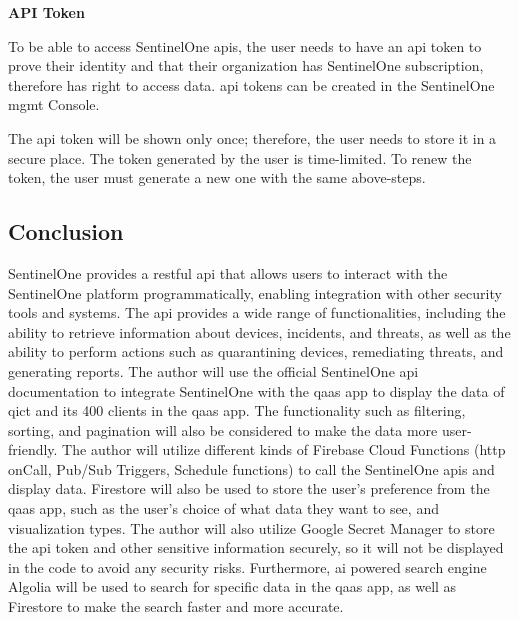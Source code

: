 \begin{multicols}{2}
      \textbf{API Token}

      To be able to access SentinelOne \acrshort{api}s, the user needs to have an \acrshort{api} token to prove their
      identity and that their organization has SentinelOne subscription, therefore has right to access data.
      \acrshort{api} tokens can be created in the SentinelOne \acrshort{mgmt} Console.

      The \acrshort{api} token will be shown only once; therefore, the user needs to store it in a secure place.
      The token generated by the user is time-limited. To renew the token, the user must generate a new one with
      the same above-steps.

      \subsection{Conclusion}
      SentinelOne provides a \acrshort{rest}ful \acrshort{api} that allows users to interact with the SentinelOne platform
      programmatically, enabling integration with other security tools and systems. The \acrshort{api} provides a wide range of
      functionalities, including the ability to retrieve information about devices, incidents, and threats, as well as the ability
      to perform actions such as quarantining devices, remediating threats, and generating reports. The author will use the official
      SentinelOne \acrshort{api} documentation to integrate SentinelOne with the \acrshort{qaas} app to display the data of
      \acrshort{qict} and its 400 clients in the \acrshort{qaas} app. The functionality such as filtering, sorting, and pagination
      will also be considered to make the data more user-friendly. The author will utilize different kinds of Firebase Cloud
      Functions (\acrshort{http} onCall, Pub/Sub Triggers, Schedule functions) to call the SentinelOne \acrshort{api}s and display
      data. Firestore will also be used to store the user's preference from the \acrshort{qaas} app, such as the user's choice of
      what data they want to see, and visualization types. The author will also utilize Google Secret Manager to store the
      \acrshort{api} token and other sensitive information securely, so it will not be displayed in the code to avoid any security
      risks. Furthermore, \acrshort{ai} powered search engine Algolia will be used to search for specific data in the \acrshort{qaas} app,
      as well as Firestore to make the search faster and more accurate.

\end{multicols}

